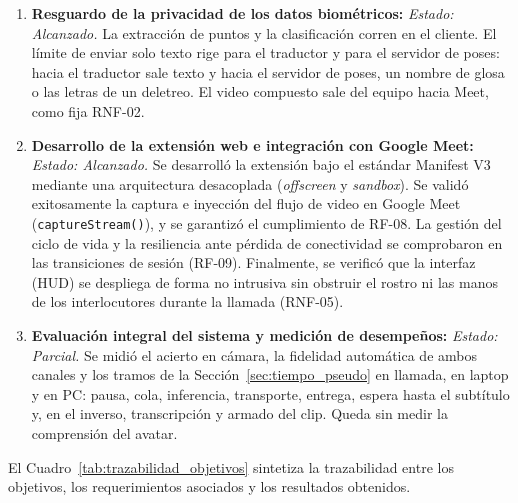 \begin{enumerate}
    \item \textbf{Resguardo de la privacidad de los datos biométricos:}
    \textit{Estado: Alcanzado.}
    La extracción de puntos y la clasificación corren en el cliente. El límite de enviar solo texto rige para el traductor y para el servidor de poses: hacia el traductor sale texto y hacia el servidor de poses, un nombre de glosa o las letras de un deletreo. El video compuesto sale del equipo hacia Meet, como fija RNF-02.

    \item \textbf{Desarrollo de la extensión web e integración con Google Meet:}
    \textit{Estado: Alcanzado.}
    Se desarrolló la extensión bajo el estándar Manifest V3 mediante una arquitectura desacoplada (\textit{offscreen} y \textit{sandbox}). Se validó exitosamente la captura e inyección del flujo de video en Google Meet (\texttt{captureStream()}), y se garantizó el cumplimiento de RF-08. La gestión del ciclo de vida y la resiliencia ante pérdida de conectividad se comprobaron en las transiciones de sesión (RF-09). Finalmente, se verificó que la interfaz (HUD) se despliega de forma no intrusiva sin obstruir el rostro ni las manos de los interlocutores durante la llamada (RNF-05).

    \item \textbf{Evaluación integral del sistema y medición de desempeños:}
    \textit{Estado: Parcial.}
    Se midió el acierto en cámara, la fidelidad automática de ambos canales y los tramos de la Sección~\ref{sec:tiempo_pseudo} en llamada, en laptop y en PC: pausa, cola, inferencia, transporte, entrega, espera hasta el subtítulo y, en el inverso, transcripción y armado del clip. Queda sin medir la comprensión del avatar.
\end{enumerate}

El Cuadro~\ref{tab:trazabilidad_objetivos} sintetiza la trazabilidad entre los objetivos, los requerimientos asociados y los resultados obtenidos.

